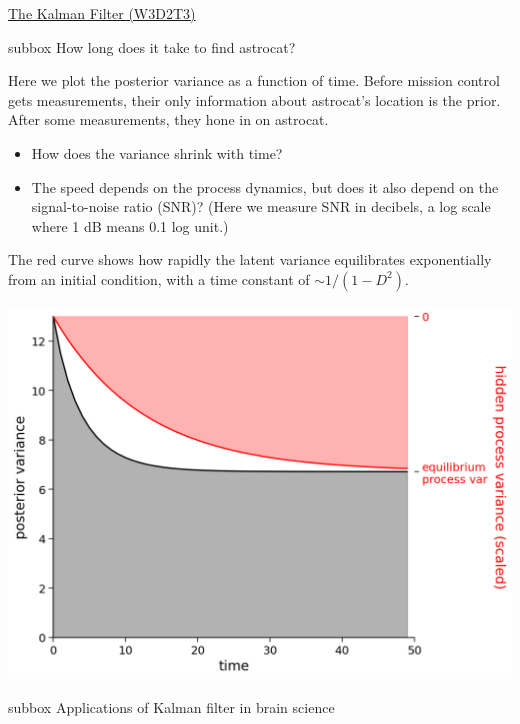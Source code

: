 \begin{textbox}{\href{http://instructor.compneuro.neuromatch.io/tutorials/W3D2_HiddenDynamics/instructor/W3D2_Tutorial3.html}{The Kalman Filter (W3D2T3)}   }

\begin{subbox}{subbox}{ How long does it take to find astrocat?}
\scriptsize

Here we plot the posterior variance as a function of time. Before mission control gets measurements, their only information about astrocat's location is the prior. After some measurements, they hone in on astrocat.
\begin{itemize}
    \item 
 How does the variance shrink with time?
\item The speed depends on the process dynamics, but does it also depend on the signal-to-noise ratio (SNR)? (Here we measure SNR in decibels, a log scale where 1 dB means 0.1 log unit.)
\end{itemize}

The red curve shows how rapidly the latent variance equilibrates exponentially from an initial condition, with a time constant of $\sim 1/(1-D^2)$. 

\begin{center}
    
\includegraphics[scale=0.25]{Figures/HD/HD_Figure9.png}
\end{center}

\end{subbox}
\begin{subbox}{subbox}{ Applications of Kalman filter in brain science}
\scriptsize



\end{subbox}
\end{textbox}
